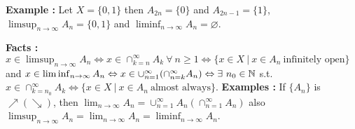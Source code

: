 \textbf{Example :} Let $X = \{0,1\}$ then $A_{2n} = \{0\}$ and $A_{2n-1} = \{1\}$, $\limsup_{n\to\infty}A_n = \{0,1\}$ and $\liminf_{n\to\infty}A_n = \varnothing$.

\textbf{Facts : }$x\in\limsup_{n\to\infty}A_n \Leftrightarrow x\in \cap_{k=n}^{\infty}A_k\ \forall\ n\geq 1 \Leftrightarrow \{x\in X\ |\ x\in A_n\ \text{infinitely open}\}$ and $x\in \liminf_{n\to\infty} A_n \Leftrightarrow x\in \cup_{n=1}^{\infty}(\cap_{n=k}^{\infty}A_n)\Leftrightarrow \exists\ n_0\in\N $ s.t. $x\in\cap_{k=n_0}^{\infty}A_k\Leftrightarrow \{x\in X\ |\ x\in A_n\ \text{almost always}\}$.
\textbf{Examples : } If $\{A_n\}$ is $\nearrow (\searrow)$, then $\lim_{n\to\infty}A_n = \cup_{n=1}^{\infty} A_n(\cap_{n=1}^{\infty} A_n)$ also $\limsup_{n\to\infty}A_n = \lim_{n\to\infty}A_n = \liminf_{n\to\infty} A_n$.





















